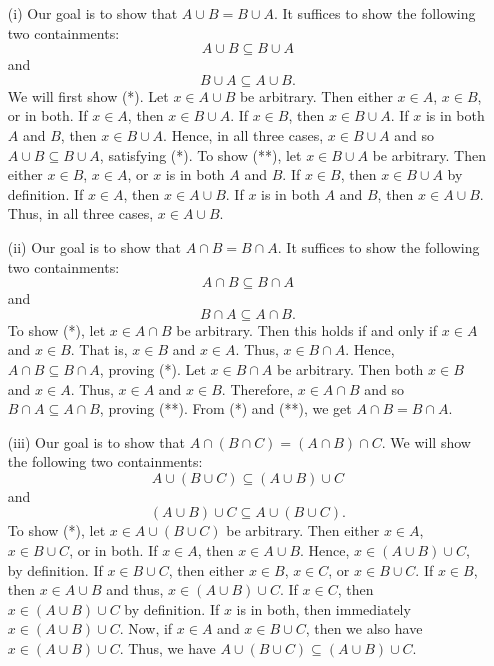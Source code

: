 \documentclass[a4paper]{article}
\begin{document}
\begin{enumerate}
    \item[(i)] Our goal is to show that \( A \cup B = B \cup A  \). It suffices to show the following two containments:
        \[  A \cup B \subseteq  B \cup A \tag{*}  \]
        and
        \[  B \cup A \subseteq  A \cup B. \tag{**} \]
        We will first show (*). Let \( x \in A \cup B  \) be arbitrary. Then either \( x \in A  \), \( x \in B  \), or in both. If \( x \in A  \), then \( x \in B \cup A  \). If \( x \in B  \), then \( x \in B \cup A  \). If \( x  \) is in both \( A  \) and \( B  \), then \( x \in B \cup A  \). Hence, in all three cases, \( x \in B \cup A  \) and so \( A \cup B \subseteq  B \cup A  \), satisfying (*). To show (**), let \( x \in B \cup A  \) be arbitrary. Then either \( x \in B  \), \( x \in A  \), or \( x  \) is in both \( A  \) and \( B  \). If \( x \in B  \), then \( x \in B \cup A  \) by definition. If \( x \in A   \), then \( x \in A \cup  B \). If \( x  \) is in both \( A  \) and \( B  \), then \( x \in A \cup B \). Thus, in all three cases, \( x \in A \cup B \).

    \item[(ii)] Our goal is to show that \( A \cap B = B \cap A  \). It suffices to show the following two containments:
        \[ A \cap B \subseteq  B \cap A  \tag{*}  \]
        and
        \[  B \cap A \subseteq  A \cap B. \tag{**}  \]
        To show (*), let \( x \in A \cap B  \) be arbitrary. Then this holds if and only if \( x \in A  \) and \( x \in B \). That is, \( x \in B  \) and \( x \in A  \). Thus, \( x \in B \cap A   \). Hence, \( A \cap B \subseteq B \cap A  \), proving (*). Let \( x \in B \cap A  \) be arbitrary. Then both \( x \in B  \) and \( x \in A  \). Thus, \( x \in A  \) and \( x \in B  \). Therefore, \( x \in A \cap B  \) and so \(  B \cap A \subseteq  A \cap B  \), proving (**). From (*) and (**), we get \( A \cap B = B \cap A \).
    \item[(iii)] Our goal is to show that \( A \cap (B \cap C) = (A \cap B) \cap C  \). We will show the following two containments:
        \[  A \cup (B \cup C) \subseteq  (A \cup B) \cup C \tag{*} \]
        and
        \[  (A \cup B) \cup C \subseteq A \cup (B \cup C). \tag{**} \]
        To show (*), let \( x \in A \cup (B \cup C) \) be arbitrary. Then either \( x \in A  \), \( x \in B \cup C  \), or in both. If \( x \in A  \), then \( x \in A \cup B \). Hence, \( x \in (A \cup B) \cup C  \), by definition. If \( x \in B \cup C  \), then either \( x \in B  \), \( x \in C  \), or \( x \in B \cup C  \). If \( x \in B  \), then \( x \in A \cup B  \) and thus, \( x \in (A \cup B) \cup C  \). If \( x \in C  \), then \( x \in (A \cup B) \cup C  \) by definition. If \( x  \) is in both, then immediately \( x \in (A \cup B) \cup C  \). Now, if \( x \in A  \) and \( x \in B \cup C  \), then we also have \( x \in (A \cup B) \cup C  \). Thus, we have \( A \cup (B \cup C ) \subseteq (A \cup B) \cup C  \).


\end{enumerate}
\end{document}
